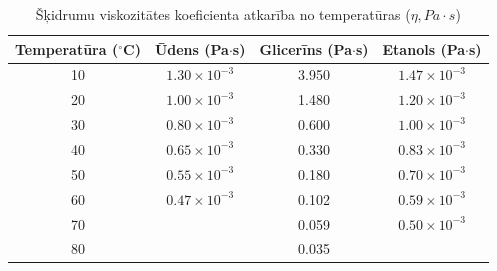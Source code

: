 \documentclass[a4paper]{article}
\begin{document}
\begin{table}[h]
    \centering
    \begin{tabular}{|c|c|c|c|}
        \hline
        \textbf{Temperatūra ($^\circ$C)} & \textbf{Ūdens (Pa$\cdot$s)} & \textbf{Glicerīns (Pa$\cdot$s)} & \textbf{Etanols (Pa$\cdot$s)} \\
        \hline
        10 & $1.30 \times 10^{-3}$ & 3.950 & $1.47 \times 10^{-3}$ \\
        20 & $1.00 \times 10^{-3}$ & 1.480 & $1.20 \times 10^{-3}$ \\
        30 & $0.80 \times 10^{-3}$ & 0.600 & $1.00 \times 10^{-3}$ \\
        40 & $0.65 \times 10^{-3}$ & 0.330 & $0.83 \times 10^{-3}$ \\
        50 & $0.55 \times 10^{-3}$ & 0.180 & $0.70 \times 10^{-3}$ \\
        60 & $0.47 \times 10^{-3}$ & 0.102 & $0.59 \times 10^{-3}$ \\
        70 &  & 0.059 & $0.50 \times 10^{-3}$ \\
        80 &  & 0.035 &  \\
        \hline
    \end{tabular}
    \caption{Šķidrumu viskozitātes koeficienta atkarība no temperatūras (\( \eta, Pa \cdot s\))}
    \label{tab:viscosity}
\end{table}
\end{document}

